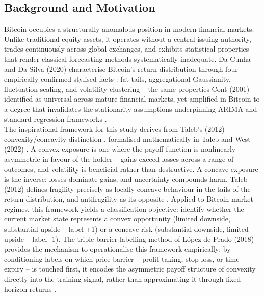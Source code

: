 \subsection{Background and Motivation}
Bitcoin occupies a structurally anomalous position in modern financial markets. Unlike traditional equity assets, it operates without a central issuing authority, trades continuously across global exchanges, and exhibits statistical properties that render classical forecasting methods systematically inadequate. Da Cunha and Da Silva (2020) characterise Bitcoin's return distribution through four empirically confirmed stylised facts \cite{dacunhaRelevantStylizedFacts2020}: fat tails, aggregational Gaussianity, fluctuation scaling, and volatility clustering -- the same properties Cont (2001) \cite{EmpiricalPropertiesAsset2001} identified as universal across mature financial markets, yet amplified in Bitcoin to a degree that invalidates the stationarity assumptions underpinning ARIMA and standard regression frameworks \cite{dacunhaRelevantStylizedFacts2020}.\\
The inspirational framework for this study derives from Taleb's (2012) convexity/concavity distinction \cite{taleb2012understanding}, formalised mathematically in Taleb and West (2022) \cite{talebWorkingConvexResponses2023}. A convex exposure is one where the payoff function is nonlinearly asymmetric in favour of the holder -- gains exceed losses across a range of outcomes, and volatility is beneficial rather than destructive. A concave exposure is the inverse: losses dominate gains, and uncertainty compounds harm. Taleb (2012) defines fragility precisely as locally concave behaviour in the tails of the return distribution, and antifragility as its opposite \cite{taleb2012understanding}. Applied to Bitcoin market regimes, this framework yields a classification objective: identify whether the current market state represents a convex opportunity (limited downside, substantial upside -- label +1) or a concave risk (substantial downside, limited upside -- label -1). The triple-barrier labelling method of López de Prado (2018) provides the mechanism to operationalise this framework empirically: by conditioning labels on which price barrier -- profit-taking, stop-loss, or time expiry -- is touched first, it encodes the asymmetric payoff structure of convexity directly into the training signal, rather than approximating it through fixed-horizon returns \cite{lopezdepradoAdvancesFinancialMachine2018}.

